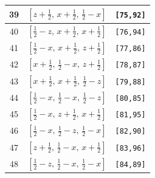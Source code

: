 \documentclass[fleqn,8pt]{jsarticle}
\begin{document}
\begin{longtable}{ccc}
39 & $\left[ z + \frac{1}{2},\, x + \frac{1}{2},\, \frac{1}{2} - x \right]$ & {\tt [75,92]} \\ \hline
40 & $\left[ \frac{1}{2} - z,\, x + \frac{1}{2},\, x + \frac{1}{2} \right]$ & {\tt [76,94]} \\ \hline
41 & $\left[ \frac{1}{2} - x,\, x + \frac{1}{2},\, z + \frac{1}{2} \right]$ & {\tt [77,86]} \\ \hline
42 & $\left[ x + \frac{1}{2},\, \frac{1}{2} - x,\, z + \frac{1}{2} \right]$ & {\tt [78,87]} \\ \hline
43 & $\left[ x + \frac{1}{2},\, x + \frac{1}{2},\, \frac{1}{2} - z \right]$ & {\tt [79,88]} \\ \hline
44 & $\left[ \frac{1}{2} - x,\, \frac{1}{2} - x,\, \frac{1}{2} - z \right]$ & {\tt [80,85]} \\ \hline
45 & $\left[ \frac{1}{2} - x,\, z + \frac{1}{2},\, x + \frac{1}{2} \right]$ & {\tt [81,95]} \\ \hline
46 & $\left[ \frac{1}{2} - x,\, \frac{1}{2} - z,\, \frac{1}{2} - x \right]$ & {\tt [82,90]} \\ \hline
47 & $\left[ z + \frac{1}{2},\, \frac{1}{2} - x,\, x + \frac{1}{2} \right]$ & {\tt [83,96]} \\ \hline
48 & $\left[ \frac{1}{2} - z,\, \frac{1}{2} - x,\, \frac{1}{2} - x \right]$ & {\tt [84,89]} \\
\end{longtable}
\renewcommand{\arraystretch}{1.2}
\end{document}
